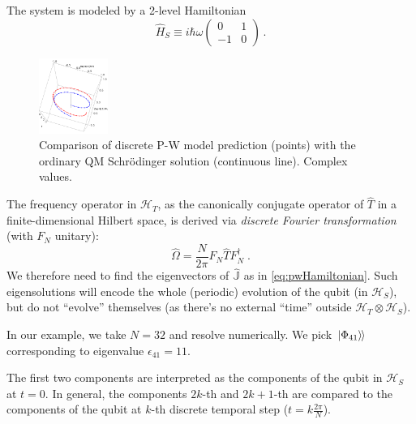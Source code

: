 \documentclass[a0,portrait]{a0poster}
\newcommand{\hilb}[1]{\mathcal{#1}}       %
\newcommand{\ox}{\otimes}
\DeclareMathOperator*{\repr}{\equiv}      %
\newcommand{\smallback}{\hspace{-0.115em}}
\newcommand{\dket}[1]{\left.\left| #1 \right\rangle\smallback\right\rangle}
\begin{document}
\begin{multicols}{2}
The system is modeled by a 2-level Hamiltonian
\[
  \hat{H}_S \repr
  i \hbar \omega
  \begin{pmatrix}
    0   & 1   \\
    -1  & 0
  \end{pmatrix}
  \, \text{.}
\]

\begin{figure}
  \begin{center}
    \includegraphics[width=0.2\textwidth]{PWfit32top-largelabels.png}
  \end{center}
  \caption{
    \color{Green}
    Comparison of discrete P-W model prediction (points) with the ordinary QM Schr\"odinger solution (continuous line).
    Complex values.
  }
\end{figure}

The frequency operator in $\hilb{H}_T$, as the canonically conjugate operator
of $\hat{T}$ in a finite-dimensional Hilbert space, is derived via
\emph{discrete Fourier transformation} \cite{FiniteHilb} (with $F_N$ unitary):
\begin{equation}
  \boxed{
    \hat{\Omega} = \frac{N}{2\pi} F^{}_{N} \hat{T} F^{\dagger}_{N}
  }
  \; \text{.}
\end{equation}
%
We therefore need to find the eigenvectors of $\hat{\mathbb{J}}$ as in \eqref{eq:pwHamiltonian}.
Such eigensolutions
will encode the whole (periodic) evolution of the qubit (in $\hilb{H}_S$), but do
not ``evolve'' themselves (as there's no external ``time'' outside $\hilb{H}_T \ox \hilb{H}_S$).

In our example, we take $N = 32$ and resolve numerically.
%
We pick $\dket{\Phi_{41}}$ corresponding to eigenvalue
$\epsilon_{41} = 11$.

The first two components
are interpreted as the components of the qubit in $\hilb{H}_S$ at $t=0$.
In general, the components
$2k$\nobreakdash-th and $2k+1$\nobreakdash-th
are compared to the components of the qubit at $k$-th discrete temporal step ($t = k \frac{2\pi}{N}$).


\end{multicols}
\end{document}
